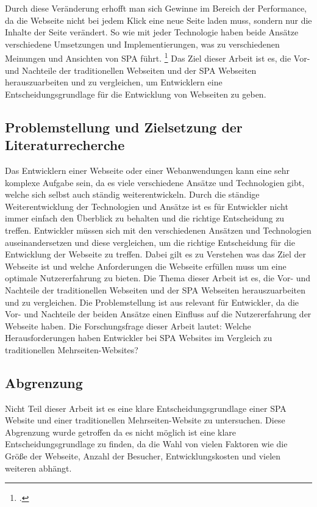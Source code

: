 Durch diese Veränderung erhofft man sich Gewinne im Bereich der Performance, da die Webseite nicht bei jedem Klick eine neue Seite laden muss, sondern nur die Inhalte der Seite verändert.
So wie mit jeder Technologie haben beide Ansätze verschiedene Umsetzungen und Implementierungen, was zu verschiedenen Meinungen und Ansichten von \ac{SPA} führt. \footcite[Vgl.][Seite 4]{Flanagan2011}
Das Ziel dieser Arbeit ist es, die Vor- und Nachteile der traditionellen Webseiten und der \ac{SPA} Webseiten herauszuarbeiten und zu vergleichen,
um Entwicklern eine Entscheidungsgrundlage für die Entwicklung von Webseiten zu geben.

\subsection{Problemstellung und Zielsetzung der Literaturrecherche}
Das Entwicklern einer Webseite oder einer Webanwendungen kann eine sehr komplexe Aufgabe sein, da es viele verschiedene Ansätze und Technologien gibt, welche sich selbst auch ständig weiterentwickeln.
Durch die ständige Weiterentwicklung der Technologien und Ansätze ist es für Entwickler nicht immer einfach den Überblick zu behalten und die richtige Entscheidung zu treffen.
Entwickler müssen sich mit den verschiedenen Ansätzen und Technologien auseinandersetzen und diese vergleichen, um die richtige Entscheidung für die Entwicklung der Webseite zu treffen.
Dabei gilt es zu Verstehen was das Ziel der Webseite ist und welche Anforderungen die Webseite erfüllen muss um eine optimale Nutzererfahrung zu bieten.
Die Thema dieser Arbeit ist es, die Vor- und Nachteile der traditionellen Webseiten und der \ac{SPA} Webseiten herauszuarbeiten und zu vergleichen.
Die Problemstellung ist aus relevant für Entwickler, da die Vor- und Nachteile der beiden Ansätze einen Einfluss auf die Nutzererfahrung der Webseite haben.
Die Forschungsfrage dieser Arbeit lautet: Welche Herausforderungen haben Entwickler bei \ac{SPA} Websites im Vergleich zu traditionellen Mehrseiten-Websites?

\subsection{Abgrenzung}
Nicht Teil dieser Arbeit ist es eine klare Entscheidungsgrundlage einer \ac{SPA} Website und einer traditionellen Mehrseiten-Website zu untersuchen.
Diese Abgrenzung wurde getroffen da es nicht möglich ist eine klare Entscheidungsgrundlage zu finden, da die Wahl von vielen Faktoren wie die Größe der Webseite,
Anzahl der Besucher, Entwicklungskosten und vielen weiteren abhängt.

